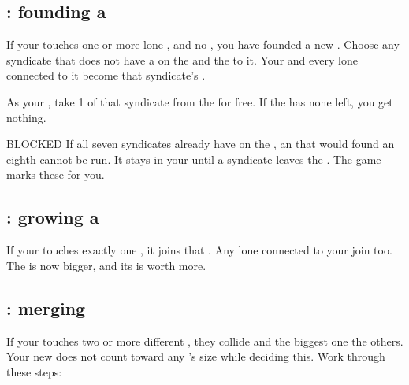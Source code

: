
\subsection{: founding a }
If your  touches one or more lone , and no , you have founded a new .
Choose any syndicate that does not have a  on the  and  the  to it. Your  and every lone
 connected to it become that syndicate's .

As your , take 1  of that syndicate from the  for free. If the  has none left,
you get nothing.


\begin{note}{BLOCKED \MakeUppercase{}}
If all seven syndicates already have  on the , an  that would found an eighth  cannot be run.
It stays in your  until a syndicate leaves the . The game marks these for you.
\end{note}

\subsection{: growing a }
If your  touches exactly one , it joins that . Any lone  connected to your  join too.
The  is now bigger, and its  is worth more.

\subsection{: merging }
If your  touches two or more different , they collide and the biggest one  the
others. Your new  does not count toward any 's size while deciding this. Work through these steps:

